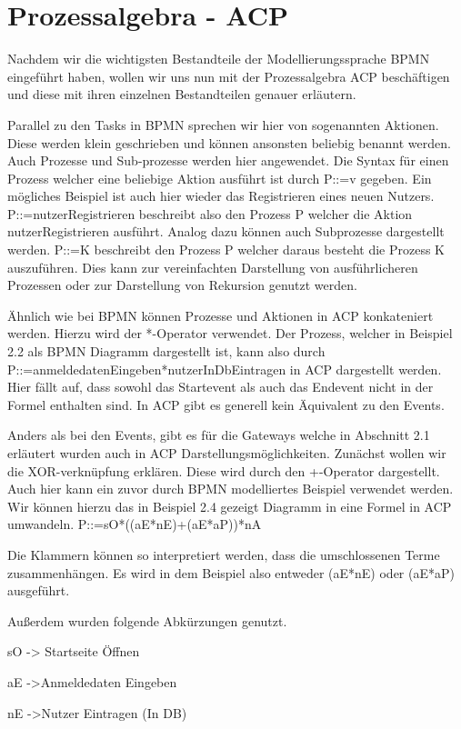 \section {Prozessalgebra - ACP}
Nachdem wir die wichtigsten Bestandteile der Modellierungssprache BPMN eingeführt haben, wollen wir uns nun mit der Prozessalgebra ACP beschäftigen und diese mit ihren einzelnen Bestandteilen genauer erläutern.

Parallel zu den Tasks in BPMN sprechen wir hier von sogenannten Aktionen. Diese werden klein geschrieben und können ansonsten beliebig benannt werden. Auch Prozesse und Sub-prozesse werden hier angewendet. Die Syntax für einen Prozess welcher eine beliebige Aktion ausführt ist durch P::=v gegeben. Ein mögliches Beispiel ist auch hier wieder das Registrieren eines neuen Nutzers. P::=nutzerRegistrieren beschreibt also den Prozess P welcher die Aktion nutzerRegistrieren ausführt. Analog dazu können auch Subprozesse dargestellt werden. P::=K beschreibt den Prozess P welcher daraus besteht die Prozess K auszuführen. Dies kann zur vereinfachten Darstellung von ausführlicheren Prozessen oder zur Darstellung von Rekursion genutzt werden.

Ähnlich wie bei BPMN können Prozesse und Aktionen in ACP konkateniert werden. Hierzu wird der *-Operator verwendet. Der Prozess, welcher in Beispiel 2.2 als BPMN Diagramm dargestellt ist, kann also durch P::=anmeldedatenEingeben*nutzerInDbEintragen in ACP dargestellt werden. Hier fällt auf, dass sowohl das Startevent als auch das Endevent nicht in der Formel enthalten sind. In ACP gibt es generell kein Äquivalent zu den Events.

Anders als bei den Events, gibt es für die Gateways welche in Abschnitt 2.1 erläutert wurden auch in ACP Darstellungsmöglichkeiten. Zunächst wollen wir die XOR-verknüpfung erklären. Diese wird durch den +-Operator dargestellt. Auch hier kann ein zuvor durch BPMN modelliertes Beispiel verwendet werden. Wir können hierzu das in Beispiel 2.4 gezeigt Diagramm in eine Formel in ACP umwandeln. P::=sO*((aE*nE)+(aE*aP))*nA

Die Klammern können so interpretiert werden, dass die umschlossenen Terme zusammenhängen. Es wird in dem Beispiel also entweder (aE*nE) oder (aE*aP) ausgeführt.

Außerdem wurden folgende Abkürzungen genutzt.

sO -> Startseite Öffnen

aE ->Anmeldedaten Eingeben

nE ->Nutzer Eintragen (In DB)

